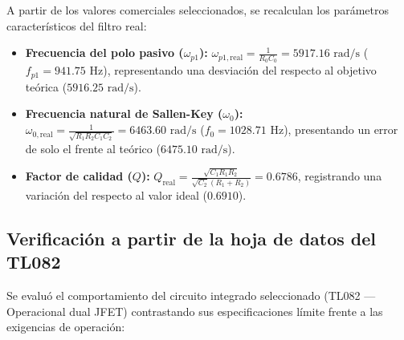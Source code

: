 \documentclass[12pt]{article}
\begin{document}
A partir de los valores comerciales seleccionados, se recalculan los parámetros característicos del filtro real:
\begin{itemize}
    \item \textbf{Frecuencia del polo pasivo ($\omega_{p1}$):} $\omega_{p1, \text{real}} = \frac{1}{R_0 C_0} = 5917.16\text{ rad/s}$ ($f_{p1} = 941.75\text{ Hz}$), representando una desviación del  respecto al objetivo teórica ($5916.25\text{ rad/s}$).
    \item \textbf{Frecuencia natural de Sallen-Key ($\omega_0$):} $\omega_{0, \text{real}} = \frac{1}{\sqrt{R_1 R_2 C_1 C_2}} = 6463.60\text{ rad/s}$ ($f_0 = 1028.71\text{ Hz}$), presentando un error de solo el  frente al teórico ($6475.10\text{ rad/s}$).
    \item \textbf{Factor de calidad ($Q$):} $Q_{\text{real}} = \frac{\sqrt{C_1 R_1 R_2}}{\sqrt{C_2}(R_1 + R_2)} = 0.6786$, registrando una variación del  respecto al valor ideal ($0.6910$).
\end{itemize}

\subsection{Verificación a partir de la hoja de datos del TL082}
Se evaluó el comportamiento del circuito integrado seleccionado (TL082 — Operacional dual JFET) contrastando sus especificaciones límite frente a las exigencias de operación:
\end{document}
